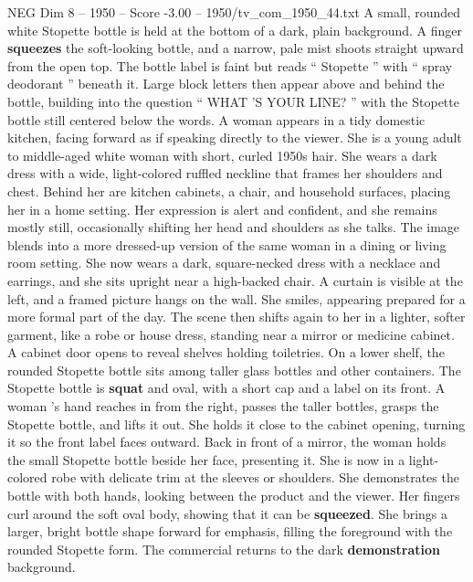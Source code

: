 \begin{textsample}{NEG Dim 8 – 1950 – Score -3.00 – 1950/tv\_com\_1950\_44.txt}  \label{ex:f8_neg_025}
A small, rounded white Stopette bottle is held at the bottom of a dark, plain background.
A finger \textbf{squeezes} the soft-looking bottle, and a narrow, pale mist shoots straight upward from the open top.
The bottle label is faint but reads “ Stopette ” with “ spray deodorant ” beneath it.
Large block letters then appear above and behind the bottle, building into the question “ WHAT ’S YOUR LINE? ” with the Stopette bottle still centered below the words.
A woman appears in a tidy domestic kitchen, facing forward as if speaking directly to the viewer.
She is a young adult to middle-aged white woman with short, curled 1950s hair.
She wears a dark dress with a wide, light-colored ruffled neckline that frames her shoulders and chest.
Behind her are kitchen cabinets, a chair, and household surfaces, placing her in a home setting.
Her expression is alert and confident, and she remains mostly still, occasionally shifting her head and shoulders as she talks.
The image blends into a more dressed-up version of the same woman in a dining or living room setting.
She now wears a dark, square-necked dress with a necklace and earrings, and she sits upright near a high-backed chair.
A curtain is visible at the left, and a framed picture hangs on the wall.
She smiles, appearing prepared for a more formal part of the day.
The scene then shifts again to her in a lighter, softer garment, like a robe or house dress, standing near a mirror or medicine cabinet.
A cabinet door opens to reveal shelves holding toiletries.
On a lower shelf, the rounded Stopette bottle sits among taller glass bottles and other containers.
The Stopette bottle is \textbf{squat} and oval, with a short cap and a label on its front.
A woman ’s hand reaches in from the right, passes the taller bottles, grasps the Stopette bottle, and lifts it out.
She holds it close to the cabinet opening, turning it so the front label faces outward.
Back in front of a mirror, the woman holds the small Stopette bottle beside her face, presenting it.
She is now in a light-colored robe with delicate trim at the sleeves or shoulders.
She demonstrates the bottle with both hands, looking between the product and the viewer.
Her fingers curl around the soft oval body, showing that it can be \textbf{squeezed}.
She brings a larger, bright bottle shape forward for emphasis, filling the foreground with the rounded Stopette form.
The commercial returns to the dark \textbf{demonstration} background.

\end{textsample}
